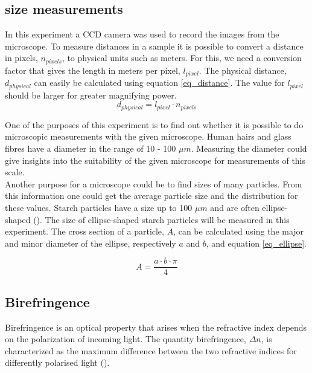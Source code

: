 \subsection{size measurements}
In this experiment a CCD camera was used to record the images from the microscope. To measure distances in a sample it is possible to convert a distance in pixels, $n_{pixels}$, to physical units such as meters. For this, we need a conversion factor that gives the length in meters per pixel, $l_{pixel}$. The physical distance, $d_{physical}$ can easily be calculated using equation \ref{eq_distance}. The value for $l_{pixel}$ should be larger for greater magnifying power.\\

\begin{equation}
	\label{eq_distance}
	d_{physical} = l_{pixel} \cdot n_{pixels}
\end{equation}

\bigskip
\vspace{5mm}

One of the purposes of this experiment is to find out whether it is possible to do microscopic measurements with the given microscope. Human hairs and glass fibres have a diameter in the range of 10 - 100 $\mu m$. Measuring the diameter could give insights into the suitability of the given microscope for measurements of this scale.\\
Another purpose for a microscope could be to find sizes of many particles. From this information one could get the average particle size and the distribution for these values. Starch particles have a size up to 100 $\mu m$ and are often ellipse-shaped (\cite{starch}). The size of ellipse-shaped starch particles will be measured in this experiment. The cross section of a particle, $A$, can be calculated using the major and minor diameter of the ellipse, respectively $a$ and $b$, and equation \ref{eq_ellipse}.

\begin{equation}
	\label{eq_ellipse}
	A = \frac{a \cdot b \cdot \pi}{4}
\end{equation}
\clearpage

\subsection{Birefringence}

Birefringence is an optical property that arises when the refractive index depends on the polarization of incoming light. The quantity birefringence, $\Delta n$, is characterized as the maximum difference between the two refractive indices for differently polarised light (\cite{hecht}).\\

